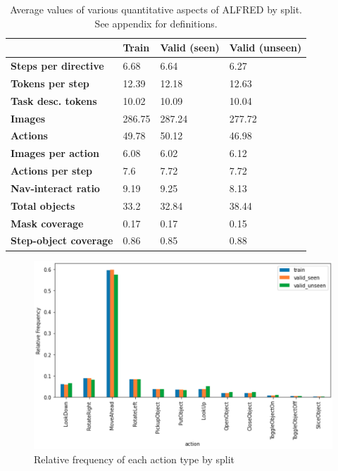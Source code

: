 \documentclass[11pt,a4paper]{article}
\begin{document}
\begin{table}[H]
\small
\begin{tabular}{@{}llll@{}}
\toprule
                                     & \textbf{Train} & \textbf{Valid (seen)} & \textbf{Valid (unseen)} \\ \midrule
\textbf{Steps per directive}                       & 6.68           & 6.64                 & 6.27                   \\
\textbf{Tokens per step}                   & 12.39          & 12.18                & 12.63                  \\
\textbf{Task desc. tokens}                  & 10.02          & 10.09                & 10.04                  \\
\textbf{Images}                      & 286.75         & 287.24               & 277.72                 \\
\textbf{Actions}                     & 49.78          & 50.12                & 46.98                  \\
\textbf{Images per action}               & 6.08           & 6.02                 & 6.12                   \\
\textbf{Actions per step}                & 7.6            & 7.72                 & 7.72                   \\
\textbf{Nav-interact ratio}                & 9.19           & 9.25                 & 8.13                   \\
\textbf{Total objects}              & 33.2           & 32.84                & 38.44                  \\
\textbf{Mask coverage} & 0.17           & 0.17                 & 0.15                   \\
\textbf{Step-object coverage}    & 0.86           & 0.85                 & 0.88                   \\ \bottomrule
\end{tabular}
\caption{Average values of various quantitative aspects of ALFRED by split. See appendix for definitions.}
\label{tab:dataset-means}
\end{table}

\begin{figure}[H]
\centering
\includegraphics[scale=0.13]{figures/action_freq.png}
\caption{Relative frequency of each action type by split}
\label{fig:action-freq}
\end{figure}
\end{document}

